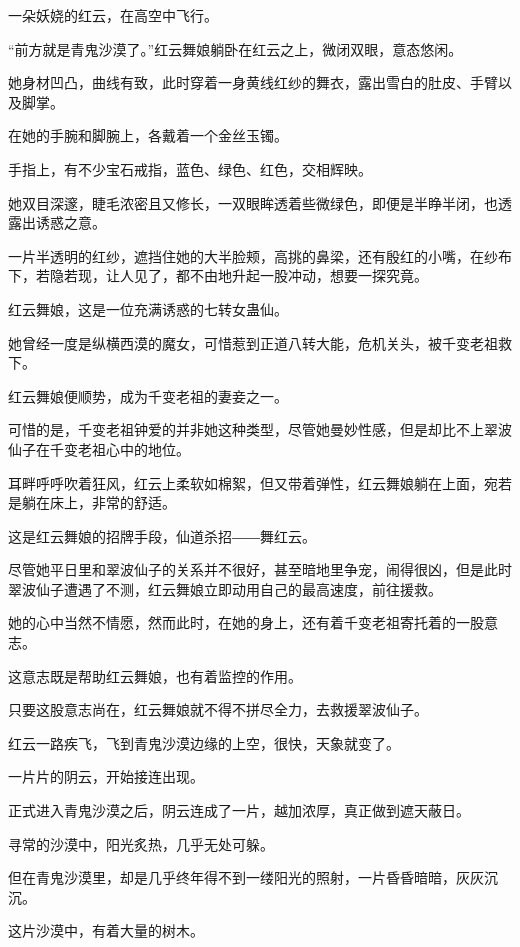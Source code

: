 
\begin{this_body}

一朵妖娆的红云，在高空中飞行。

“前方就是青鬼沙漠了。”红云舞娘躺卧在红云之上，微闭双眼，意态悠闲。

她身材凹凸，曲线有致，此时穿着一身黄线红纱的舞衣，露出雪白的肚皮、手臂以及脚掌。

在她的手腕和脚腕上，各戴着一个金丝玉镯。

手指上，有不少宝石戒指，蓝色、绿色、红色，交相辉映。

她双目深邃，睫毛浓密且又修长，一双眼眸透着些微绿色，即便是半睁半闭，也透露出诱惑之意。

一片半透明的红纱，遮挡住她的大半脸颊，高挑的鼻梁，还有殷红的小嘴，在纱布下，若隐若现，让人见了，都不由地升起一股冲动，想要一探究竟。

红云舞娘，这是一位充满诱惑的七转女蛊仙。

她曾经一度是纵横西漠的魔女，可惜惹到正道八转大能，危机关头，被千变老祖救下。

红云舞娘便顺势，成为千变老祖的妻妾之一。

可惜的是，千变老祖钟爱的并非她这种类型，尽管她曼妙性感，但是却比不上翠波仙子在千变老祖心中的地位。

耳畔呼呼吹着狂风，红云上柔软如棉絮，但又带着弹性，红云舞娘躺在上面，宛若是躺在床上，非常的舒适。

这是红云舞娘的招牌手段，仙道杀招――舞红云。

尽管她平日里和翠波仙子的关系并不很好，甚至暗地里争宠，闹得很凶，但是此时翠波仙子遭遇了不测，红云舞娘立即动用自己的最高速度，前往援救。

她的心中当然不情愿，然而此时，在她的身上，还有着千变老祖寄托着的一股意志。

这意志既是帮助红云舞娘，也有着监控的作用。

只要这股意志尚在，红云舞娘就不得不拼尽全力，去救援翠波仙子。

红云一路疾飞，飞到青鬼沙漠边缘的上空，很快，天象就变了。

一片片的阴云，开始接连出现。

正式进入青鬼沙漠之后，阴云连成了一片，越加浓厚，真正做到遮天蔽日。

寻常的沙漠中，阳光炙热，几乎无处可躲。

但在青鬼沙漠里，却是几乎终年得不到一缕阳光的照射，一片昏昏暗暗，灰灰沉沉。

这片沙漠中，有着大量的树木。


\end{this_body}
